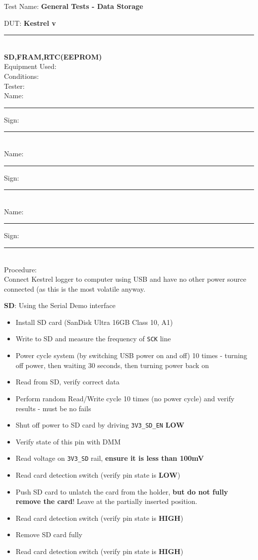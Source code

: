 
\noindent
{\Huge Test Name: \textbf{General Tests - Data Storage}}\\[20pt]
{\Large DUT: \textbf{Kestrel v}\rule{1cm}{0.15mm}}\\ \textbf{SD,FRAM,RTC(EEPROM)} \\[10pt]
{\Large Equipment Used: }\\[40pt]
{\Large Conditions: }\\[40pt]
{\Large Tester: }\\[10pt]
Name: \rule{4cm}{0.15mm} \hfill Sign: \rule{4cm}{0.15mm}\\[5pt]
Name: \rule{4cm}{0.15mm} \hfill Sign: \rule{4cm}{0.15mm}\\[5pt]
Name: \rule{4cm}{0.15mm} \hfill Sign: \rule{4cm}{0.15mm}\\[15pt]
{\Large Procedure: }\\
Connect Kestrel logger to computer using USB and have no other power source connected (as this is the most volatile anyway. 

{\large \textbf{SD}:}
Using the Serial Demo interface
\begin{itemize}
\item Install SD card (SanDisk Ultra 16GB Class 10, A1)
\item Write to SD and measure the frequency of \texttt{SCK} line
\item Power cycle system (by switching USB power on and off) 10 times - turning off power, then waiting 30 seconds, then turning power back on
\item Read from SD, verify correct data
\item Perform random Read/Write cycle 10 times (no power cycle) and verify results - must be no fails
\item Shut off power to SD card by driving \texttt{3V3\_SD\_EN} \textbf{LOW}
\item Verify state of this pin with DMM
\item Read voltage on \texttt{3V3\_SD} rail, \textbf{ensure it is less than 100mV}
\item Read card detection switch (verify pin state is \textbf{LOW})
\item Push SD card to unlatch the card from the holder, \textbf{but do not fully remove the card}! Leave at the partially inserted position.
\item Read card detection switch (verify pin state is \textbf{HIGH})
\item Remove SD card fully
\item Read card detection switch (verify pin state is \textbf{HIGH})
\end{itemize}

